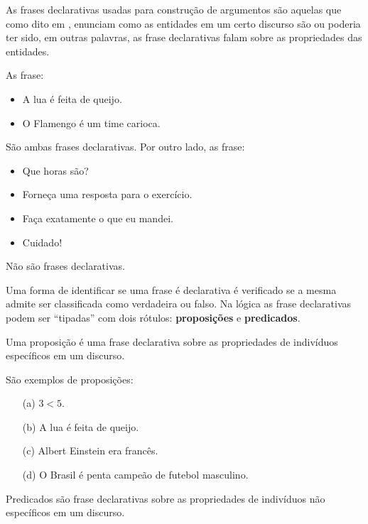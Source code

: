 As frases declarativas usadas para construção de argumentos são aquelas que como dito em \cite{joaoPavao2014}, enunciam como as entidades em um certo discurso são ou poderia ter sido, em outras palavras, as frase declarativas falam sobre as propriedades das entidades.

\begin{exem}\label{exe:FrasesDeclarativas}
	As frase:
	\begin{itemize}
		\item A lua é feita de queijo.
		\item O Flamengo é um time carioca.
	\end{itemize}
	São ambas frases declarativas. Por outro lado, as frase:
	\begin{itemize}
		\item Que horas são?
		\item Forneça uma resposta para o exercício.
		\item Faça exatamente o que eu mandei.
		\item Cuidado!
	\end{itemize}
	Não são frases declarativas.
\end{exem}

Uma forma de identificar se uma frase é declarativa é verificado se a mesma admite ser classificada como verdadeira ou falso.  Na lógica as frase declarativas podem ser ``tipadas'' com dois rótulos: \textbf{proposições} e \textbf{predicados}. 

\begin{definition}[Proposição]\label{def:Proposicao}
	Uma proposição é uma frase declarativa sobre as propriedades de indivíduos específicos em um discurso.
\end{definition}

\begin{exem}\label{exe:Proposicoes}
	São exemplos de proposições:
	\begin{itemize}
		\item[(a)] $3 < 5$.
		\item[(b)] A lua é feita de queijo.
		\item[(c)] Albert Einstein era francês.
		\item[(d)] O Brasil é penta campeão de futebol masculino.
	\end{itemize}
\end{exem}

\begin{definition}[Predicados]\label{def:Predicados}
	Predicados são frase declarativas sobre as propriedades de indivíduos não específicos em um discurso.
\end{definition}

